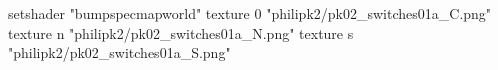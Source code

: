 setshader "bumpspecmapworld"
    texture 0 "philipk2/pk02_switches01a_C.png"
    texture n "philipk2/pk02_switches01a_N.png"
    texture s "philipk2/pk02_switches01a_S.png"